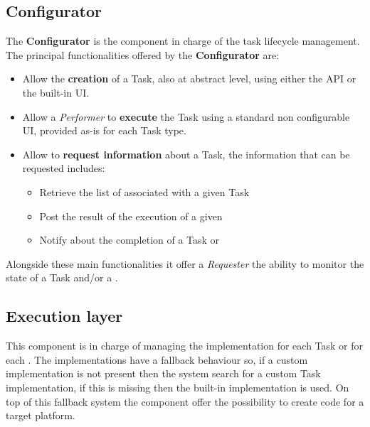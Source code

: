 \subsection{Configurator}\label{sec:configurator}
The \textbf{Configurator} is the component in charge of the task lifecycle
management. The principal functionalities offered by the \textbf{Configurator}
are:
\begin{itemize}
    \item Allow the \textbf{creation} of a Task, also at abstract level, using
    either the API or the built-in UI.

    \item Allow a \emph{Performer} to \textbf{execute} the Task using a standard
    non configurable UI, provided as-is for each Task type.

    \item Allow to \textbf{request information} about a Task, the information
    that can be requested includes:
    \begin{itemize}
        \item Retrieve the list of \utask{} associated with a given Task

        \item Post the result of the execution of a given \utask{}

        \item Notify about the completion of a Task or \utask{}
    \end{itemize}
\end{itemize}

Alongside these main functionalities it offer a \emph{Requester} the ability to
monitor the state of a Task and/or a \utask{}.




\subsection{Execution layer}\label{sec:exec-layer}
This component is in charge of managing the \utask{} implementation for each Task
or for each \utask{}. The implementations have a fallback behaviour so, if a
custom \utask{} implementation is not present then the system search for a
custom Task implementation, if this is missing then the built-in implementation
is used. On top of this fallback system the component offer the possibility to
create code for a target platform.


